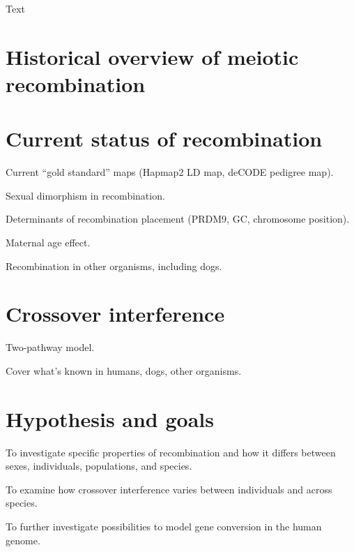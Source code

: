 
Text

\section{Historical overview of meiotic recombination}

\section{Current status of recombination}
\begin{titemize}
    \item Current ``gold standard'' maps (Hapmap2 LD map, deCODE pedigree map).
    \item Sexual dimorphism in recombination.
    \item Determinants of recombination placement (PRDM9, GC, chromosome position).
    \item Maternal age effect.
    \item Recombination in other organisms, including dogs.
\end{titemize}
\section{Crossover interference}
\begin{titemize}
    \item Two-pathway model.
    \item Cover what's known in humans, dogs, other organisms.
\end{titemize}
\section{Hypothesis and goals}
\begin{titemize}
    \item To investigate specific properties of recombination and how it differs between sexes, individuals, populations, and species.
    \item To examine how crossover interference varies between individuals and across species.
    \item To further investigate possibilities to model gene conversion in the human genome.
\end{titemize}
